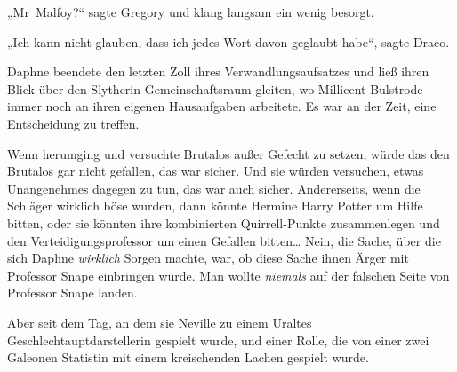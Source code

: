 „Mr~Malfoy?“ sagte Gregory und klang langsam ein wenig besorgt.

„Ich kann nicht glauben, dass ich jedes Wort davon geglaubt habe“, sagte Draco.

\later

Daphne beendete den letzten Zoll ihres Verwandlungsaufsatzes und ließ ihren Blick über den Slytherin-Gemeinschaftsraum gleiten, wo Millicent Bulstrode immer noch an ihren eigenen Hausaufgaben arbeitete. Es war an der Zeit, eine Entscheidung zu treffen.

Wenn \SPHEW herumging und versuchte Brutalos außer Gefecht zu setzen, würde das den Brutalos gar nicht gefallen, das war sicher. Und sie würden versuchen, etwas Unangenehmes dagegen zu tun, das war auch sicher. Andererseits, wenn die Schläger wirklich böse wurden, dann könnte Hermine Harry Potter um Hilfe bitten, oder sie könnten ihre kombinierten Quirrell-Punkte zusammenlegen und den Verteidigungsprofessor um einen Gefallen bitten… Nein, die Sache, über die sich Daphne \emph{wirklich} Sorgen machte, war, ob diese Sache ihnen Ärger mit Professor Snape einbringen würde. Man wollte \emph{niemals} auf der falschen Seite von Professor Snape landen.

Aber seit dem Tag, an dem sie Neville zu einem Uraltes Geschlechtauptdarstellerin gespielt wurde, und einer Rolle, die von einer zwei Galeonen Statistin mit einem kreischenden Lachen gespielt wurde.


